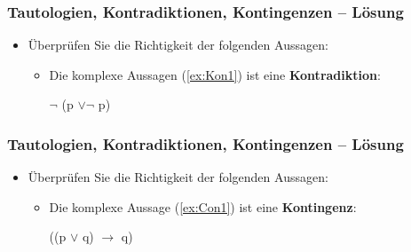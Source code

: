 {\begin{frame}
\end{frame}


\begin{frame}
\frametitle{Tautologien, Kontradiktionen, Kontingenzen -- Lösung}

\begin{itemize}
	\item Überprüfen Sie die Richtigkeit der folgenden Aussagen:
	
	\begin{itemize}
		\item Die komplexe Aussagen (\ref{ex:Kon1}) ist eine \textbf{Kontradiktion}:
		
		\begin{exe}
		 $\lnot$ (p $\lor \lnot$ p)
		\end{exe}
		
	\end{itemize}	
	
\end{itemize}

\end{frame}


\begin{frame}
\frametitle{Tautologien, Kontradiktionen, Kontingenzen -- Lösung}

\begin{itemize}
	\item Überprüfen Sie die Richtigkeit der folgenden Aussagen:
	
	\begin{itemize}
		\item Die komplexe Aussage (\ref{ex:Con1}) ist eine \textbf{Kontingenz}:
		
		\begin{exe}
		 ((p $\lor$ q) $\rightarrow$ q)
		\end{exe}
		
	\end{itemize}	
	
\end{itemize}

\end{frame}


}%


